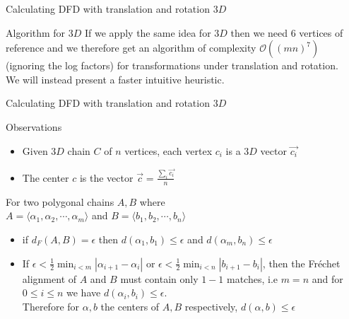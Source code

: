 \documentclass{beamer}
\begin{document}
\begin{frame}{Calculating DFD with translation and rotation $3D$}
  \begin{block}{Algorithm for $3D$}
    If we apply the same idea for $3D$ then we need $6$ vertices of reference and we therefore get an algorithm of complexity $\mathcal{O}((mn)^7)$ (ignoring the log factors) for transformations under translation and rotation.\\
    We will instead present a faster intuitive heuristic.
  \end{block}
\end{frame}

\begin{frame}{Calculating DFD with translation and rotation $3D$}
  \begin{block}{Observations}
    \begin{itemize}
      \item Given $3D$ chain $C$ of $n$ vertices, each vertex $c_i$ is a $3D$ vector $\vec{c_i}$
      \item The center $c$ is the vector $\vec{c} = \frac{\sum_i \vec{c_i}}{n}$
    \end{itemize}
    For two polygonal chains $A,B$ where\\
    $A = \langle \alpha_1,\alpha_2,\cdots,\alpha_m \rangle$ and $B = \langle b_1,b_2,\cdots,b_n \rangle$
    \begin{itemize}
      \item if $d_F(A,B) = \epsilon$ then $d(\alpha_1,b_1) \leq \epsilon$ and $d(\alpha_m,b_n) \leq \epsilon$
      \item If $\epsilon < \frac{1}{2}\min_{i < m} |\alpha_{i+1}-\alpha_i|$ or $\epsilon < \frac{1}{2}\min_{i < n} |b_{i+1}-b_i|$, then the Fréchet alignment of $A$ and $B$ must contain only $1-1$ matches, i.e $m = n$ and for $0 \leq i \leq n$ we have $d(\alpha_i,b_i) \leq \epsilon$.\\
      Therefore for $\alpha,b$ the centers of $A,B$ respectively, $d(\alpha, b) \leq \epsilon$
    \end{itemize}
  \end{block}
\end{frame}
\end{document}
